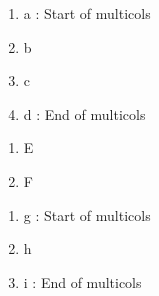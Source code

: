 \documentclass{article}
\begin{document}
\begin{multicols}{2}
	\begin{enumerate}
		\item a : Start of multicols
		\item b
		\item c
		\item d : End of multicols
	\end{enumerate}
\end{multicols}

\begin{enumerate}[resume]
	\item E
	\item F
\end{enumerate}

\begin{multicols}{2}
	\begin{enumerate}[resume]
		\item g : Start of multicols
		\item h
		\item i : End of multicols
	\end{enumerate}
\end{multicols}
\end{document}
